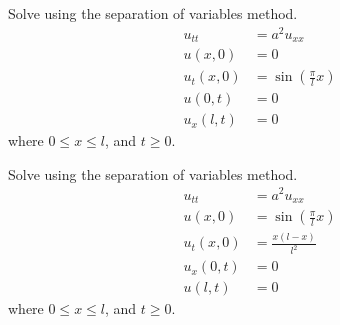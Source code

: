 \documentclass[fleqn, a4paper, 11pt, oneside]{amsart}
\theoremstyle{definition}
\theoremstyle{theorem}
\begin{document}
\begin{question}
	Solve using the separation of variables method.
	\begin{align*}
		u_{t t}  & = a^2 u_{x x}                        \\
		u(x,0)   & = 0                                  \\
		u_t(x,0) & = \sin\left( \frac{\pi}{l} x \right) \\
		u(0,t)   & = 0                                  \\
		u_x(l,t) & = 0
	\end{align*}
	where $0 \le x \le l$, and $t \ge 0$.
\end{question}

\begin{question}
	Solve using the separation of variables method.
	\begin{align*}
		u_{t t}  & = a^2 u_{x x}                        \\
		u(x,0)   & = \sin\left( \frac{\pi}{l} x \right) \\
		u_t(x,0) & = \frac{x (l - x)}{l^2}              \\
		u_x(0,t) & = 0                                  \\
		u(l,t)   & = 0
	\end{align*}
	where $0 \le x \le l$, and $t \ge 0$.
\end{question}
\end{document}
